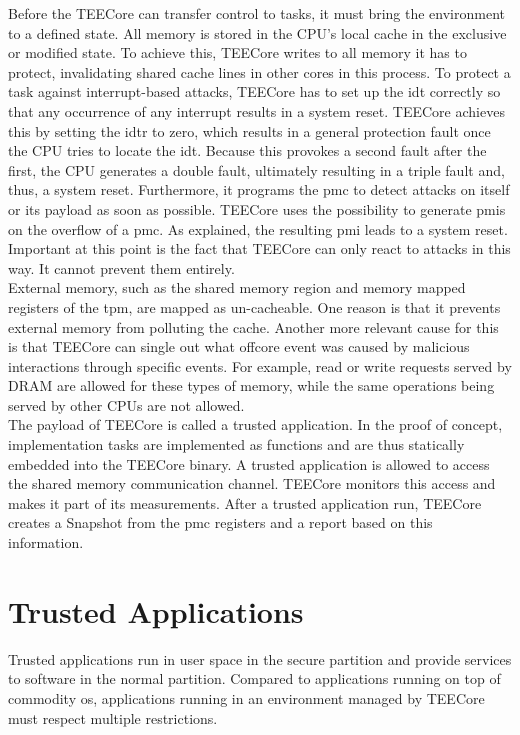 Before the TEECore can transfer control to tasks, it must bring the environment
to a defined state. All memory is stored in the CPU's local cache in the
exclusive or modified state. To achieve this, TEECore writes to all memory it
has to protect, invalidating shared cache lines in other cores in this process.
To protect a task against interrupt-based attacks, TEECore has to set up the
\gls{idt} correctly so that any occurrence of any interrupt results in a system
reset. TEECore achieves this by setting the \gls{idtr} to zero, which results in
a general protection fault once the CPU tries to locate the \gls{idt}. Because
this provokes a second fault after the first, the CPU generates a double fault,
ultimately resulting in a triple fault and, thus, a system reset. Furthermore,
it programs the \gls{pmc} to detect attacks on itself or its payload as soon as
possible. TEECore uses the possibility to generate \glspl{pmi} on the overflow
of a \gls{pmc}. As explained, the resulting \gls{pmi} leads to a system reset.
Important at this point is the fact that TEECore can only react to attacks in
this way. It cannot prevent them entirely.\\

External memory, such as the shared memory region and memory mapped registers of
the \gls{tpm}, are mapped as un-cacheable. One reason is that it prevents
external memory from polluting the cache. Another more relevant cause for this
is that TEECore can single out what offcore event was caused by malicious
interactions through specific events. For example, read or write requests served
by DRAM are allowed for these types of memory, while the same operations being
served by other CPUs are not allowed.\\

The payload of TEECore is called a trusted application. In the proof of concept,
implementation tasks are implemented as functions and are thus statically
embedded into the TEECore binary. A trusted application is allowed to access the
shared memory communication channel. TEECore monitors this access and makes it
part of its measurements. After a trusted application run, TEECore
creates a Snapshot from the \gls{pmc} registers and a report based on this
information.

\section{Trusted Applications}
\label{sec:30:tee_apps}
Trusted applications run in user space in the secure partition and provide
services to software in the normal partition. Compared to applications running
on top of commodity \gls{os}, applications running in an environment managed by
TEECore must respect multiple restrictions.\\

